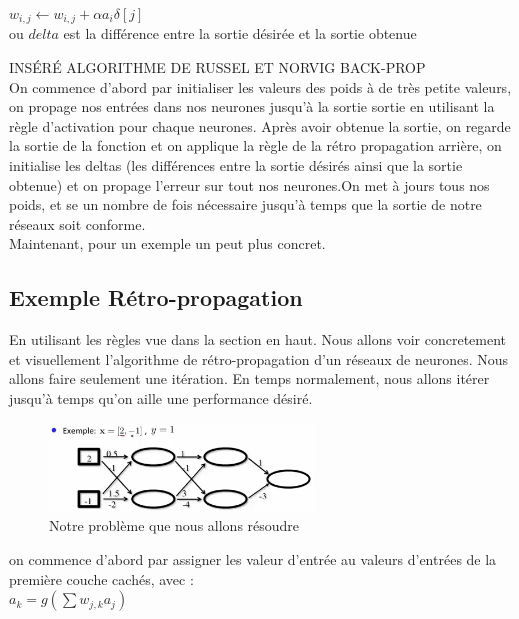 \documentclass[oneside]{book}
\begin{document}
\centering
$w_{i,j} \leftarrow w_{i,j} + \alpha a_i \delta [j]$\\

ou $delta$ est la différence entre la sortie désirée et la sortie obtenue\\
\justify


INSÉRÉ ALGORITHME DE RUSSEL ET NORVIG BACK-PROP\\

On commence d'abord par initialiser les valeurs des poids à de très petite valeurs, on propage nos entrées dans nos neurones jusqu'à la sortie sortie en utilisant la règle d'activation pour chaque neurones. Après avoir obtenue la sortie, on regarde la sortie de la fonction et on applique la règle de la rétro propagation arrière, on initialise les deltas (les différences entre la sortie désirés ainsi que la sortie obtenue) et on propage l'erreur sur tout nos neurones.On met à jours tous nos poids, et se un nombre de fois nécessaire jusqu'à temps que la sortie de notre réseaux soit conforme.\\


Maintenant, pour un exemple un peut plus concret.

\subsection{Exemple Rétro-propagation}
En utilisant les règles vue dans la section en haut. Nous allons voir concretement et visuellement l'algorithme de rétro-propagation d'un réseaux de neurones. Nous allons faire seulement une itération. En temps normalement, nous allons itérer jusqu'à temps qu'on aille une performance désiré.\\

\begin{figure}
\centering
\includegraphics[width = 7cm]{Exemple_retropropagation.png}
\caption{Notre problème que nous allons résoudre}
\label{fig:exemple_backprop}
\end{figure}

\justify
on commence d'abord par assigner les valeur d'entrée au valeurs d'entrées de la première couche cachés, avec :\\

$a_k = g(\sum\limits w_{j,k} a_j)$\\
\end{document}
